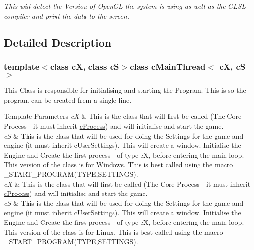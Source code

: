 \begin{DoxyCompactItemize}
\begin{DoxyCompactList}\small\item\em This will detect the Version of OpenGL the system is using as well as the GLSL compiler and print the data to the screen. \end{DoxyCompactList}\end{DoxyCompactItemize}


\subsection{Detailed Description}
\subsubsection*{template$<$class cX, class cS$>$class cMainThread$<$ cX, cS $>$}

This Class is responsible for initialising and starting the Program. This is so the program can be created from a single line. 


\begin{DoxyTemplParams}{Template Parameters}
{\em cX} & This is the class that will first be called (The Core Process -\/ it must inherit \hyperlink{classc_process}{cProcess}) and will initialise and start the game. \\
\hline
{\em cS} & This is the class that will be used for doing the Settings for the game and engine (it must inherit cUserSettings). This will create a window. Initialise the Engine and Create the first process -\/ of type cX, before entering the main loop. This version of the class is for Windows. This is best called using the macro \_\-START\_\-PROGRAM(TYPE,SETTINGS).\\
\hline
{\em cX} & This is the class that will first be called (The Core Process -\/ it must inherit \hyperlink{classc_process}{cProcess}) and will initialise and start the game. \\
\hline
{\em cS} & This is the class that will be used for doing the Settings for the game and engine (it must inherit cUserSettings). This will create a window. Initialise the Engine and Create the first process -\/ of type cX, before entering the main loop. This version of the class is for Linux. This is best called using the macro \_\-START\_\-PROGRAM(TYPE,SETTINGS). \\
\hline
\end{DoxyTemplParams}
